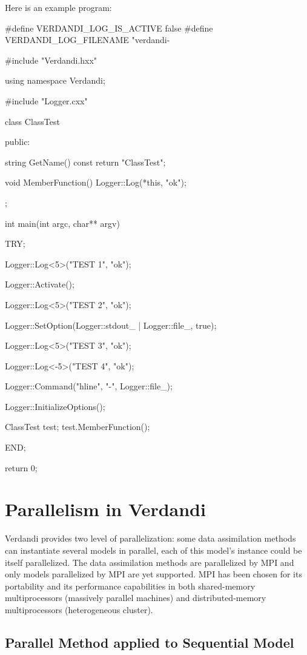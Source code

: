 \documentclass{tufte-book}
\begin{document}
\-Here is an example program:


\begin{frame_cpp}
#define VERDANDI_LOG_IS_ACTIVE false
#define VERDANDI_LOG_FILENAME "verdandi-%

#include "Verdandi.hxx"

using namespace Verdandi;

#include "Logger.cxx"


class ClassTest
{
public:

    string GetName() const
    {
        return "ClassTest";
    }


    void MemberFunction()
    {
        Logger::Log(*this, "ok");
    }
};


int main(int argc, char** argv)
{
    TRY;

    Logger::Log<5>("TEST 1", "ok");

    Logger::Activate();

    Logger::Log<5>("TEST 2", "ok");

    Logger::SetOption(Logger::stdout_ | Logger::file_, true);

    Logger::Log<5>("TEST 3", "ok");

    Logger::Log<-5>("TEST 4", "ok");

    Logger::Command("hline", "-", Logger::file_);

    Logger::InitializeOptions();

    ClassTest test;
    test.MemberFunction();

    END;

    return 0;
}
\end{frame_cpp}



\chapter{Parallelism in Verdandi}


Verdandi provides two level of parallelization: some data assimilation methods can instantiate several models in parallel, each of this model's instance could be itself parallelized. The data assimilation methods are parallelized by MPI and only models parallelized by MPI are yet supported. MPI has been chosen for its portability and its performance capabilities in both shared-memory multiprocessors (massively parallel machines) and distributed-memory multiprocessors (heterogeneous cluster).



\hypertarget{par-seq}{}\section{Parallel Method applied to Sequential Model}\label{par-seq}
\end{document}
